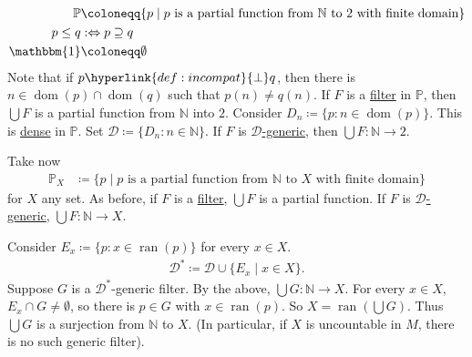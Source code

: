 \documentclass{article}
\newcommand{\named}[1]{\textbf{#1}\index{#1}}
\newcommand{\1}{\mathbbm{1}}
\DeclareMathOperator{\dom}{dom}
\DeclareMathOperator{\ran}{ran}
\begin{document}
\begin{defi}
\end{defi}

\begin{eg}
  \begin{align*}
    \mathbb{P} &\coloneqq \{p \mid p\text{ is a partial function from }\mathbb{N}\text{ to }2\text{ with finite domain}\} \\
    p \leq q &:\Leftrightarrow p \supseteq q \\
    \mathbbm{1} &\coloneqq \emptyset
  \end{align*}
  Note that if $p \hyperlink{def:incompat}{\perp} q$, then there is $n \in \dom(p) \cap \dom(q)$ such that $p(n) \neq q(n)$.
  If $F$ is a \hyperlink{def:filter}{filter} in $\mathbb{P}$, then $\bigcup F$ is a partial function from $\mathbb{N}$ into $2$.
  Consider $D_n \coloneqq \{p : n \in \dom(p)\}$.
  This is \hyperlink{def:dense}{dense} in $\mathbb{P}$.
  Set $\mathcal{D} \coloneqq \{D_n : n \in \mathbb{N}\}$.
  If $F$ is \hyperlink{def:dgeneric}{$\mathcal{D}$-generic}, then $\bigcup F: \mathbb{N} \to 2$.
\end{eg}
\begin{eg}
  Take now
  \begin{align*}
    \mathbb{P}_X &\coloneqq \{p \mid p\text{ is a partial function from }\mathbb{N}\text{ to }X\text{ with finite domain}\}
  \end{align*}
  for $X$ any set.
  As before, if $F$ is a \hyperlink{def:filter}{filter}, $\bigcup F$ is a partial function.
  If $F$ is \hyperlink{def:dgeneric}{$\mathcal{D}$-generic}, $\bigcup F: \mathbb{N} \to X$.

  Consider $E_x \coloneqq \{p : x \in \ran(p)\}$ for every $x \in X$.
  \begin{align*}
    \mathcal{D}^* \coloneqq \mathcal{D} \cup \{E_x \mid x \in X\}.
  \end{align*}
  Suppose $G$ is a $\mathcal{D}^*$-generic filter. By the above, $\bigcup G: \mathbb{N} \to X$.
  For every $x \in X$, $E_x \cap G \neq \emptyset$, so there is $p \in G$ with $x \in \ran(p)$.
  So $X = \ran(\bigcup G)$.
  Thus $\bigcup G$ is a surjection from $\mathbb{N}$ to $X$. (In particular, if $X$ is uncountable in $M$, there is no such generic filter).
\end{eg}
\end{document}
